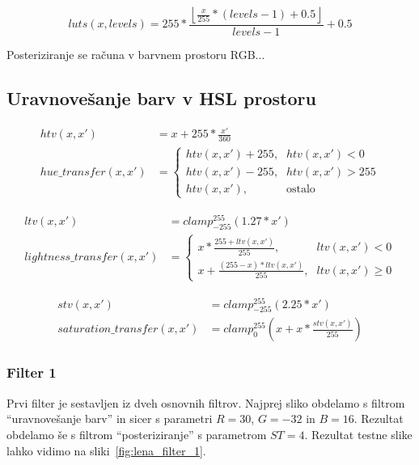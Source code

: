\begin{equation}
luts(x, levels) = 255 * \frac{\left \lfloor{\frac{x}{255} * (levels - 1) + 0.5}\right \rfloor}{levels - 1} + 0.5
\end{equation}

Posteriziranje se računa v barvnem prostoru RGB...

\subsection{Uravnovešanje barv v HSL prostoru}

\begin{align}
htv(x, x') &= x + 255 * \frac{x'}{360} \nonumber \\
hue\_transfer(x, x') &=
\begin{cases}
    htv(x, x') + 255 \text{,}& htv(x, x') < 0 \\
    htv(x, x') - 255 \text{,}& htv(x, x') > 255 \\
    htv(x, x') \text{,}& \text{ostalo}
\end{cases}
\end{align}

\begin{align}
ltv(x, x') &= clamp_{-255}^{255}(1.27 * x') \nonumber \\
lightness\_transfer(x, x') &=
\begin{cases}
    x * \frac{255 + ltv(x, x')}{255} \text{,}& ltv(x, x') < 0 \\
    x + \frac{(255 - x) * ltv(x, x')}{255} \text{,}& ltv(x, x') \geq 0
\end{cases}
\end{align}

\begin{align}
stv(x, x') &= clamp_{-255}^{255}(2.25 * x') \nonumber \\
saturation\_transfer(x, x') &= clamp_{0}^{255}(x + x * \frac{stv(x, x')}{255})
\end{align}

\subsubsection*{Filter 1}
Prvi filter je sestavljen iz dveh osnovnih filtrov. Najprej sliko obdelamo s
filtrom ``uravnovešanje barv'' in sicer s parametri $R = 30$, $G = -32$ in
$B = 16$. Rezultat obdelamo še s filtrom ``posteriziranje'' s parametrom
$ST =4$. Rezultat testne slike lahko vidimo na sliki~\ref{fig:lena_filter_1}.

